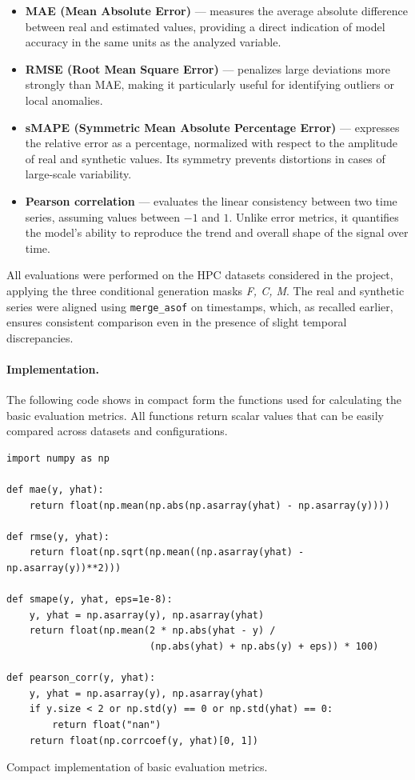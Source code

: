 \begin{itemize}
  \item \textbf{MAE (Mean Absolute Error)} — measures the average absolute difference between real and estimated values, providing a direct indication of model accuracy in the same units as the analyzed variable.
  
  \item \textbf{RMSE (Root Mean Square Error)} — penalizes large deviations more strongly than MAE, making it particularly useful for identifying outliers or local anomalies.
  
  \item \textbf{sMAPE (Symmetric Mean Absolute Percentage Error)} — expresses the relative error as a percentage, normalized with respect to the amplitude of real and synthetic values. Its symmetry prevents distortions in cases of large-scale variability.
  
  \item \textbf{Pearson correlation} — evaluates the linear consistency between two time series, assuming values between $-1$ and $1$. Unlike error metrics, it quantifies the model’s ability to reproduce the trend and overall shape of the signal over time.
\end{itemize}

All evaluations were performed on the HPC datasets considered in the project, applying the three conditional generation masks \emph{F, C, M}.  
The real and synthetic series were aligned using \texttt{merge\_asof} on timestamps, which, as recalled earlier, ensures consistent comparison even in the presence of slight temporal discrepancies.

\paragraph{Implementation.}
The following code shows in compact form the functions used for calculating the basic evaluation metrics.  
All functions return scalar values that can be easily compared across datasets and configurations.

\begin{listing}[H]
\begin{verbatim}
import numpy as np

def mae(y, yhat):
    return float(np.mean(np.abs(np.asarray(yhat) - np.asarray(y))))

def rmse(y, yhat):
    return float(np.sqrt(np.mean((np.asarray(yhat) - np.asarray(y))**2)))

def smape(y, yhat, eps=1e-8):
    y, yhat = np.asarray(y), np.asarray(yhat)
    return float(np.mean(2 * np.abs(yhat - y) /
                         (np.abs(yhat) + np.abs(y) + eps)) * 100)

def pearson_corr(y, yhat):
    y, yhat = np.asarray(y), np.asarray(yhat)
    if y.size < 2 or np.std(y) == 0 or np.std(yhat) == 0:
        return float("nan")
    return float(np.corrcoef(y, yhat)[0, 1])
\end{verbatim}
\caption{Compact implementation of basic evaluation metrics.}
\end{listing}

